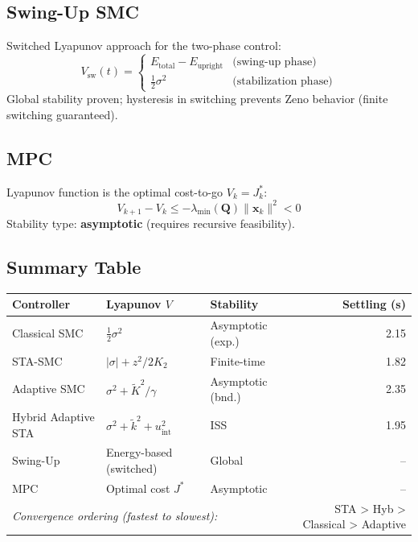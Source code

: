\documentclass[11pt, a4paper]{article}
\newcommand{\vx}{\boldsymbol{x}}
\begin{document}
\subsection{Swing-Up SMC}

Switched Lyapunov approach for the two-phase control:
\begin{equation}
  V_\text{sw}(t) = \begin{cases}
    E_\text{total} - E_\text{upright} & \text{(swing-up phase)} \\
    \tfrac{1}{2}\sigma^2              & \text{(stabilization phase)}
  \end{cases}
\end{equation}
Global stability proven; hysteresis in switching prevents Zeno behavior
(finite switching guaranteed).

\subsection{MPC}

Lyapunov function is the optimal cost-to-go $V_k = J_k^*$:
\begin{equation}
  V_{k+1} - V_k \leq -\lambda_\text{min}(\mathbf{Q})\|\vx_k\|^2 < 0
\end{equation}
Stability type: \textbf{asymptotic} (requires recursive feasibility).

\subsection{Summary Table}

\begin{center}
\begin{tabular}{@{}p{3.5cm}p{3cm}p{2.5cm}r@{}}
\toprule
\textbf{Controller}      & \textbf{Lyapunov $V$}       & \textbf{Stability}    & \textbf{Settling (s)} \\
\midrule
Classical SMC            & $\tfrac{1}{2}\sigma^2$      & Asymptotic (exp.)     & 2.15 \\
STA-SMC                  & $|\sigma| + z^2/2K_2$       & Finite-time           & 1.82 \\
Adaptive SMC             & $\sigma^2 + \tilde{K}^2/\gamma$ & Asymptotic (bnd.) & 2.35 \\
Hybrid Adaptive STA      & $\sigma^2 + \tilde{k}^2 + u_\text{int}^2$ & ISS & 1.95 \\
Swing-Up                 & Energy-based (switched)     & Global                & -- \\
MPC                      & Optimal cost $J^*$          & Asymptotic            & -- \\
\midrule
\multicolumn{3}{l}{\textit{Convergence ordering (fastest to slowest):}} &
  STA > Hyb > Classical > Adaptive \\
\bottomrule
\end{tabular}
\end{center}
\end{document}
